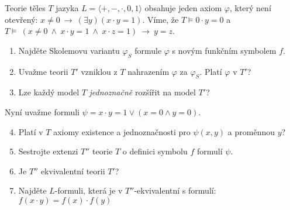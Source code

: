 \documentclass[a4paper,12pt]{article}
\begin{document}


\medskip\begin{problem} %
Teorie těles $T$ jazyka $L=\langle +,-,\cdot,0,1\rangle$ obsahuje jeden axiom $\varphi$, který není otevřený: $x\neq 0\ \to\ (\exists y)(x\cdot y=1)$. Víme, že $T\models 0\cdot y=0$ a $T\models\ (x\ne 0\ \wedge\ x\cdot y=1\ \wedge\ x\cdot z=1)\ \to\ y=z$.
\begin{enumerate}
    \item Najděte Skolemovu variantu $\varphi_S$ formule $\varphi$ s novým funkčním symbolem $f$.
    \item Uvažme teorii $T'$ vzniklou z $T$ nahrazením $\varphi$ za $\varphi_S$. Platí $\varphi$ v $T'$?
    \item Lze každý model $T$ \emph{jednoznačně} rozšířit na model $T'$?
\end{enumerate}
Nyní uvažme formuli $\psi=x\cdot y=1\vee  (x=0 \wedge y=0)$.
\begin{enumerate}
    \setcounter{enumi}{3}
    \item Platí v $T$ axiomy existence a jednoznačnosti pro $\psi(x,y)$ a proměnnou $y$?
    \item Sestrojte extenzi $T''$ teorie $T$ o definici symbolu $f$ formulí $\psi$.
    \item Je $T''$ ekvivalentní teorii $T'$?
    \item Najděte $L$-formuli, která je v $T''$-ekvivalentní s formulí:
    $f(x\cdot y)=f(x)\cdot f(y)$
\end{enumerate}
\end{problem}
\end{document}
